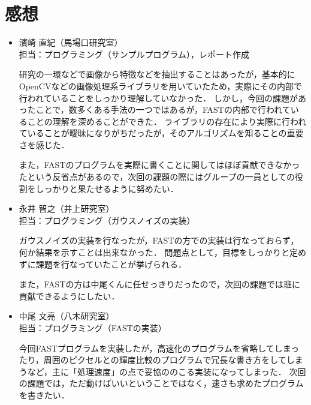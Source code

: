 \section{感想}
\begin{itemize}
    \setlength{\itemsep}{5mm}
    \item 濱崎 直紀（馬場口研究室）\\
    担当：プログラミング（サンプルプログラム），レポート作成\par
    \vspace{2mm}
    \quad
    研究の一環などで画像から特徴などを抽出することはあったが，基本的にOpenCVなどの画像処理系ライブラリを用いていたため，実際にその内部で行われていることをしっかり理解していなかった．
    しかし，今回の課題があったことで，数多くある手法の一つではあるが，FASTの内部で行われていることの理解を深めることができた．
    ライブラリの存在により実際に行われていることが曖昧になりがちだったが，そのアルゴリズムを知ることの重要さを感じた．\par\quad
    また，FASTのプログラムを実際に書くことに関してはほぼ貢献できなかったという反省点があるので，次回の課題の際にはグループの一員としての役割をしっかりと果たせるように努めたい．
    \item 永井 智之（井上研究室）\\
    担当：プログラミング（ガウスノイズの実装）\par
    \vspace{2mm}
    \quad
    ガウスノイズの実装を行なったが，FASTの方での実装は行なっておらず，何か結果を示すことは出来なかった．
    問題点として，目標をしっかりと定めずに課題を行なっていたことが挙げられる．\par\quad
    また，FASTの方は中尾くんに任せっきりだったので，次回の課題では班に貢献できるようにしたい．
    \item 中尾 文亮（八木研究室）\\
    担当：プログラミング（FASTの実装）\par
    \vspace{2mm}
    \quad
    今回FASTプログラムを実装したが，高速化のプログラムを省略してしまったり，周囲のピクセルとの輝度比較のプログラムで冗長な書き方をしてしまうなど，主に「処理速度」の点で妥協ののこる実装になってしまった．
    次回の課題では，ただ動けばいいということではなく，速さも求めたプログラムを書きたい．
\end{itemize}
